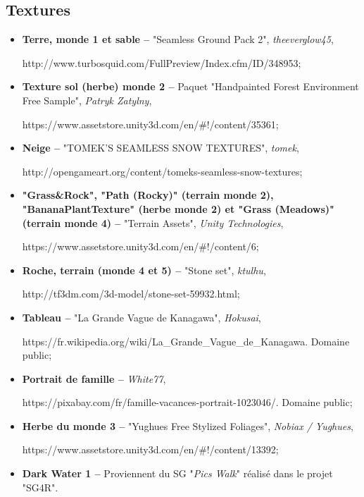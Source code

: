 
\subsection*{Textures}

	\begin{itemize}
		\item \textbf{Terre, monde 1 et sable --} "Seamless Ground Pack 2", \textit{theeverglow45}, 
		
		http://www.turbosquid.com/FullPreview/Index.cfm/ID/348953;
		
		\item \textbf{Texture sol (herbe) monde 2 --} Paquet "Handpainted Forest Environment Free Sample", \textit{Patryk Zatylny}, 
		
		https://www.assetstore.unity3d.com/en/\#!/content/35361;
		
		\item \textbf{Neige --} "TOMEK'S SEAMLESS SNOW TEXTURES", \textit{tomek}, 
		
		http://opengameart.org/content/tomeks-seamless-snow-textures;		
		
		\item \textbf{"Grass\&Rock", "Path (Rocky)" (terrain monde 2), "BananaPlantTexture" (herbe monde 2) et "Grass (Meadows)" (terrain monde 4) --} "Terrain Assets", \textit{Unity Technologies}, 
		
		https://www.assetstore.unity3d.com/en/\#!/content/6;
		
		\item \textbf{Roche, terrain (monde 4 et 5) --} "Stone set", \textit{ktulhu}, 
		
		http://tf3dm.com/3d-model/stone-set-59932.html;
		
		\item \textbf{Tableau --} "La Grande Vague de Kanagawa", \textit{Hokusai}, 
		
		https://fr.wikipedia.org/wiki/La\_Grande\_Vague\_de\_Kanagawa. Domaine public;
		
		\item \textbf{Portrait de famille --} \textit{White77}, 
		
		https://pixabay.com/fr/famille-vacances-portrait-1023046/. Domaine public;
		
		\item \textbf{Herbe du monde 3 --} "Yughues Free Stylized Foliages", \textit{Nobiax / Yughues}, 
		
		https://www.assetstore.unity3d.com/en/\#!/content/13392;
		
		
		\item \textbf{Dark Water 1 --} Proviennent du SG "\textit{Pics Walk}" réalisé dans le projet "SG4R".%
	\end{itemize}
	
